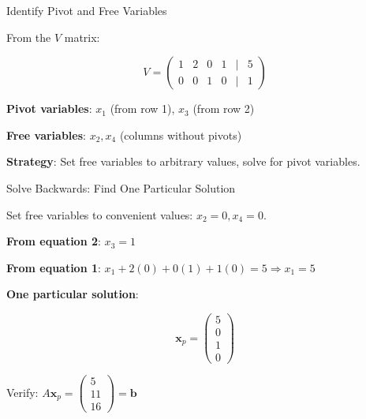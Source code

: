 \documentclass[10pt]{beamer}
\theoremstyle{definition}
\newcommand{\x}[1]{\alert{\textbf{#1}}}
\begin{document}
\begin{frame}{Identify Pivot and Free Variables}

From the $V$ matrix:

$$V = \begin{pmatrix}
1 & 2 & 0 & 1 & \mid & 5 \\
0 & 0 & 1 & 0 & \mid & 1
\end{pmatrix}$$

\vspace{1em}

\x{Pivot variables}: $x_1$ (from row 1), $x_3$ (from row 2)

\x{Free variables}: $x_2, x_4$ (columns without pivots)

\vspace{1em}

\x{Strategy}: Set free variables to arbitrary values, solve for pivot variables.

\end{frame}

\begin{frame}{Solve Backwards: Find One Particular Solution}

Set free variables to convenient values: $x_2 = 0, x_4 = 0$.

\vspace{1em}

\x{From equation 2}: $x_3 = 1$

\x{From equation 1}: $x_1 + 2(0) + 0(1) + 1(0) = 5 \Rightarrow x_1 = 5$

\vspace{1em}

\x{One particular solution}:

$$\mathbf{x}_p = \begin{pmatrix} 5 \\ 0 \\ 1 \\ 0 \end{pmatrix}$$

\vspace{0.5em}

Verify: $A\mathbf{x}_p = \begin{pmatrix} 5 \\ 11 \\ 16 \end{pmatrix} = \mathbf{b}$ \checkmark

\end{frame}
\end{document}
